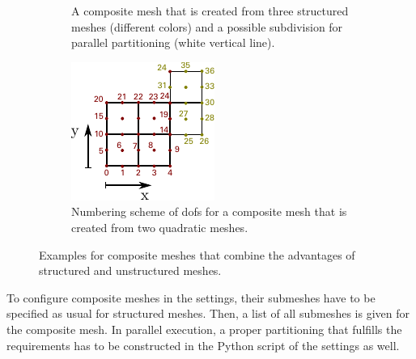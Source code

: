 \begin{figure}%
  \centering%
  \begin{subfigure}[t]{0.45\textwidth}%
    \centering%
    \def\svgwidth{0.7\textwidth}%
    
    \caption{A composite mesh that is created from three structured meshes (different colors) and a possible subdivision for parallel partitioning (white vertical line).}%
    \label{fig:meshes_composite}%
  \end{subfigure}
  \quad
  \begin{subfigure}[t]{0.45\textwidth}%
    \centering%
    \includegraphics[width=\textwidth]{images/implementation/dof_numbering_structured_composite.pdf}
    \caption{Numbering scheme of dofs for a composite mesh that is created from two quadratic meshes.}%
    \label{fig:dof_numbering_structured_composite}%
  \end{subfigure}
  \caption{Examples for composite meshes that combine the advantages of structured and unstructured meshes.}%
  \label{fig:composite_meshes}%
\end{figure}%

To configure composite meshes in the settings, their submeshes have to be specified as usual for structured meshes. Then, a list of all submeshes is given for the composite mesh. In parallel execution, a proper partitioning that fulfills the requirements has to be constructed in the Python script of the settings as well.

